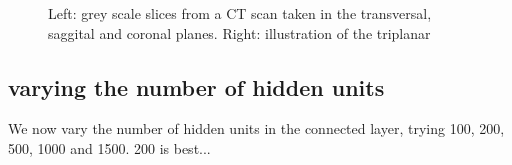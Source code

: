 \begin{figure}
\centering
\begin{minipage}{0.45\textwidth}
\centering
{}
\end{minipage}\hfill
\hspace{-1cm}
\begin{minipage}{0.45\textwidth}
\centering
{}
\end{minipage}
\caption{Left: grey scale slices from a CT scan taken in the transversal, saggital and coronal planes. Right: illustration of the triplanar}
\end{figure}

\subsection{varying the number of hidden units}

We now vary the number of hidden units in the connected layer, trying 100, 200, 500, 1000 and 1500. 200 is best...

